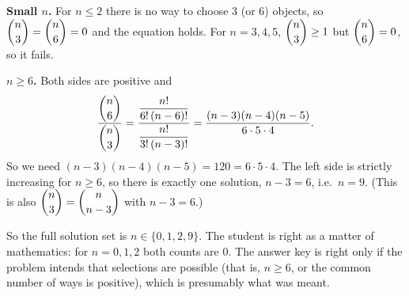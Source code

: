 \textbf{Small $n$.} For $n\le2$ there is no way to choose $3$ (or $6$) objects, so $\dbinom n3=\dbinom n6=0$ and the equation holds. For $n=3,4,5$, $\dbinom n3\ge1$ but $\dbinom n6=0$, so it fails.

\textbf{$n\ge6$.} Both sides are positive and
\[
\dfrac{\dbinom n6}{\dbinom n3}=\dfrac{\dfrac{n!}{6!\,(n-6)!}}{\dfrac{n!}{3!\,(n-3)!}}=\dfrac{(n-3)(n-4)(n-5)}{6\cdot5\cdot4}.
\]
So we need $(n-3)(n-4)(n-5)=120=6\cdot5\cdot4$. The left side is strictly increasing for $n\ge6$, so there is exactly one solution, $n-3=6$, i.e.\ $n=9$. (This is also $\dbinom n3=\dbinom n{n-3}$ with $n-3=6$.)

So the full solution set is $\boxed{n\in\{0,1,2,9\}}$. The student is right as a matter of mathematics: for $n=0,1,2$ both counts are $0$. The answer key is right only if the problem intends that selections are possible (that is, $n\ge6$, or the common number of ways is positive), which is presumably what was meant.
